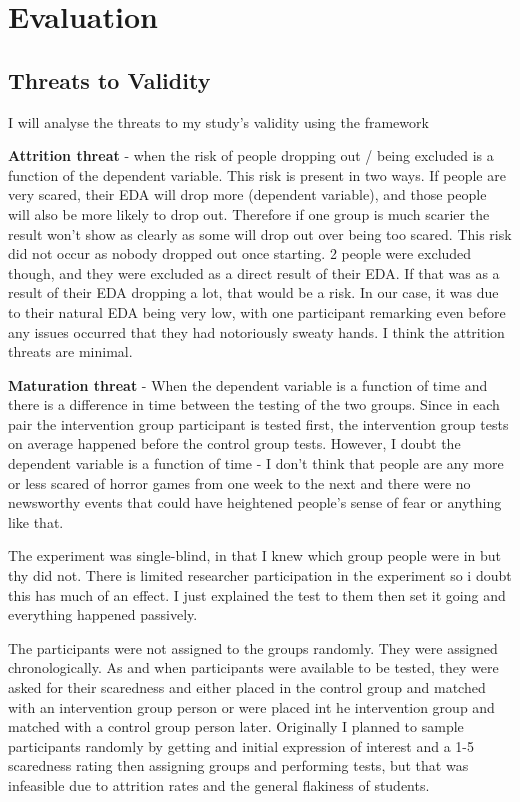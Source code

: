 \documentclass[12pt,a4paper]{article}\usepackage[]{graphicx}\usepackage[]{color}
\begin{document}
\section{Evaluation}

\subsection{Threats to Validity}
I will analyse the threats to my study's validity using the framework %

\textbf{Attrition threat} - when the risk of people dropping out / being excluded is a function of the dependent variable. This risk is present in two ways. If people are very scared, their EDA will drop more (dependent variable), and those people will also be more likely to drop out. Therefore if one group is much scarier the result won't show as clearly as some will drop out over being too scared. This risk did not occur as nobody dropped out once starting. 2 people were excluded though, and they were excluded as a direct result of their EDA. If that was as a result of their EDA dropping a lot, that would be a risk. In our case, it was due to their natural EDA being very low, with one participant remarking even before any issues occurred that they had notoriously sweaty hands. I think the attrition threats are minimal.

\textbf{Maturation threat} - When the dependent variable is a function of time and there is a difference in time between the testing of the two groups. Since in each pair the intervention group participant is tested first, the intervention group tests on average happened before the control group tests. However, I doubt the dependent variable is a function of time - I don't think that people are any more or less scared of horror games from one week to the next and there were no newsworthy events that could have heightened people's sense of fear or anything like that.

The experiment was single-blind, in that I knew which group people were in but thy did not. There is limited researcher participation in the experiment so i doubt this has much of an effect. I just explained the test to them then set it going and everything happened passively.

The participants were not assigned to the groups randomly. They were assigned chronologically. As and when participants were available to be tested, they were asked for their scaredness and either placed in the control group and matched with an intervention group person or were placed int he intervention group and matched with a control group person later. Originally I planned to sample participants randomly by getting and initial expression of interest and a 1-5 scaredness rating then assigning groups and performing tests, but that was infeasible due to attrition rates and the general flakiness of students.
\end{document}
